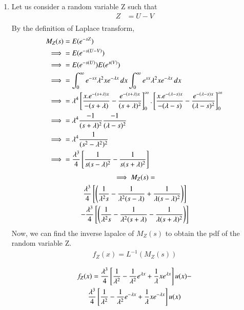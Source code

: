 \documentclass[journal,12pt,twocolumn]{IEEEtran}
\theoremstyle{remark}
\begin{document}
\begin{enumerate}
\item Let us consider a random variable Z such that 
\begin{align}
Z &= U-V\\
\end{align}
By the definition of Laplace transform,
\begin{align}
M_{Z}(s) &= E(e^{-sZ})\\
\implies  &= E(e^{-s(U-V)})\\
\implies  &= E(e^{-s(U)})E(e^{s(V)})\\
\implies  &= \int_{0}^{\infty} e^{-sx}\lambda^{2}xe^{-\lambda x} \, dx \int_{0}^{\infty} e^{sx}\lambda^{2}xe^{-\lambda x} \, dx \\
\implies  &= \lambda^4{}\left[\frac{x.e^{-(s+\lambda)x}}{-(s+\lambda)}-\frac{e^{-(s+\lambda)x}}{(s+\lambda)^2}\right]_0^{\infty}.{}\left[\frac{x.e^{-(\lambda-s)x}}{-(\lambda-s)}-\frac{e^{-(\lambda-s)x}}{(\lambda-s)^2}\right]_0^{\infty}\\
\implies  &= \lambda^4 \frac{-1}{(s+\lambda)^2} \frac{-1}{(\lambda-s)^2}\\
\implies  &= \lambda^4 \frac{1}{(s^2-\lambda^2)^2}\\
\implies  &= \frac{\lambda^3}{4 }{}\left[\frac{1}{s(s-\lambda)^2}-\frac{1}{s(s+\lambda)^2}\right]\\
\end{align}
\begin{multline}
\implies M_{Z}(s) = \\\frac{\lambda^3}{4 }{}\left[\left(\frac{1}{\lambda^2 s}-\frac{1}{\lambda^2 (s-\lambda)}+\frac{1}{\lambda(s-\lambda)^2}\right)\right]\\- \frac{\lambda^3}{4 }{}\left[\left(\frac{1}{\lambda^2 s}-\frac{1}{\lambda^2 (s+\lambda)}-\frac{1}{\lambda(s+\lambda)^2}\right)\right]
\end{multline}
Now, we can find the inverse lapalce of $M_Z (s)$ to obtain the pdf of the random variable Z.
\begin{align}
f_Z(x) = L^{-1}(M_Z(s))\\
\end{align}
\begin{multline}
f_Z(x) = \frac{\lambda^3}{4}{}\left[\frac{1}{\lambda^2}-\frac{1}{\lambda^2}e^{\lambda x}+\frac{1}{\lambda} xe^{\lambda x}\right]u(x) - \\\frac{\lambda^3}{4}{}\left[\frac{1}{\lambda^2}-\frac{1}{\lambda^2}e^{-\lambda x}+\frac{1}{\lambda} xe^{-\lambda x}\right]u(x)
\end{multline}
\begin{align}

\end{align}
\end{enumerate}
\end{document}
